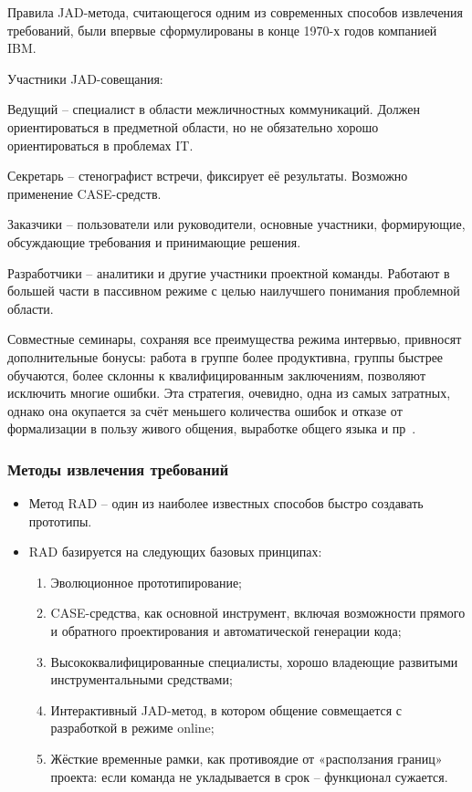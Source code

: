 \documentclass{../industrial-development}
\begin{document}
Правила JAD-метода, считающегося одним из современных способов извлечения
требований, были впервые сформулированы в конце 1970-х годов компанией IBM.

Участники JAD-совещания:

\alert{Ведущий} – специалист в области межличностных коммуникаций. Должен
ориентироваться в предметной области, но не обязательно хорошо ориентироваться в
проблемах IT.

\alert{Секретарь} – стенографист встречи, фиксирует её результаты. Возможно применение CASE-средств.

\alert{Заказчики} – пользователи или руководители, основные участники, формирующие,
обсуждающие требования и принимающие решения.

\alert{Разработчики} – аналитики и другие участники проектной команды. Работают в
большей части в пассивном режиме с целью наилучшего понимания проблемной области.

Совместные семинары, сохраняя все преимущества режима интервью, привносят дополнительные бонусы: работа в группе более продуктивна, группы быстрее обучаются, более склонны к квалифицированным заключениям, позволяют исключить многие
ошибки. Эта стратегия, очевидно, одна из самых затратных, однако она окупается за счёт
меньшего количества ошибок и отказе от формализации в пользу живого общения,
выработке общего языка и пр~\cite[с.~33]{Maglinec}.


\begin{frame} \frametitle{Методы извлечения требований}
   
\begin{itemize}
\item \alert{Метод RAD} – один из наиболее известных способов быстро создавать прототипы.
\item RAD базируется на следующих базовых принципах:
\begin{enumerate}
\item Эволюционное прототипирование;
\item CASE-средства, как основной инструмент, включая возможности прямого и
обратного проектирования и автоматической генерации кода;
\item  Высококвалифицированные специалисты, хорошо владеющие развитыми инструментальными средствами;
\item Интерактивный JAD-метод, в котором общение совмещается с разработкой в режиме online;
\item Жёсткие временные рамки, как противоядие от «расползания границ» проекта: если команда не укладывается в срок – функционал сужается.
\end{enumerate}
\end{itemize}

\end{frame}
\lecturenotes
\end{document}
